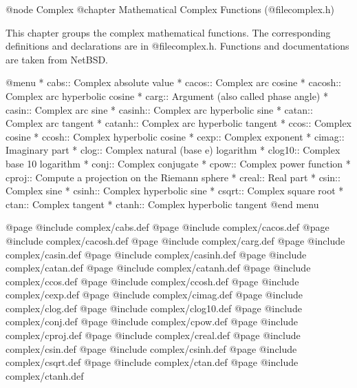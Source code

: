@node Complex
@chapter Mathematical Complex Functions (@file{complex.h})

This chapter groups the complex mathematical functions.  The
corresponding definitions and declarations are in @file{complex.h}.  
Functions and documentations are taken from NetBSD.

@menu 
* cabs::	Complex absolute value
* cacos::	Complex arc cosine
* cacosh::	Complex arc hyperbolic cosine
* carg::	Argument (also called phase angle)
* casin::	Complex arc sine
* casinh::	Complex arc hyperbolic sine
* catan::	Complex arc tangent
* catanh::	Complex arc hyperbolic tangent
* ccos::	Complex cosine
* ccosh::	Complex hyperbolic cosine
* cexp::	Complex exponent
* cimag::	Imaginary part
* clog::	Complex natural (base e) logarithm
* clog10::	Complex base 10 logarithm
* conj::	Complex conjugate
* cpow::	Complex power function
* cproj::	Compute a projection on the Riemann sphere
* creal::	Real part
* csin::	Complex sine
* csinh::	Complex hyperbolic sine
* csqrt::	Complex square root
* ctan::	Complex tangent
* ctanh::	Complex hyperbolic tangent
@end menu

@page
@include   complex/cabs.def
@page
@include   complex/cacos.def
@page
@include   complex/cacosh.def
@page
@include   complex/carg.def
@page
@include   complex/casin.def
@page
@include   complex/casinh.def
@page
@include   complex/catan.def
@page
@include   complex/catanh.def
@page
@include   complex/ccos.def
@page
@include   complex/ccosh.def
@page
@include   complex/cexp.def
@page
@include   complex/cimag.def
@page
@include   complex/clog.def
@page
@include   complex/clog10.def
@page
@include   complex/conj.def
@page
@include   complex/cpow.def
@page
@include   complex/cproj.def
@page
@include   complex/creal.def
@page
@include   complex/csin.def
@page
@include   complex/csinh.def
@page
@include   complex/csqrt.def
@page
@include   complex/ctan.def
@page
@include   complex/ctanh.def
